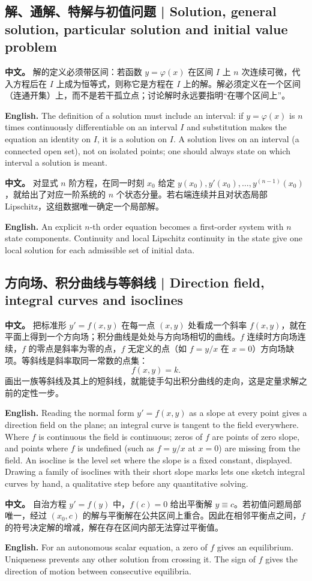 \documentclass[UTF8,11pt,a4paper]{ctexart}
\newcommand{\APS}[2]{\par\noindent\textbf{中文。} #1\par\noindent\textbf{English.} #2\par}
\begin{document}
\subsection{解、通解、特解与初值问题 | Solution, general solution, particular solution and initial value problem}
\APS{解的定义必须带区间：若函数 $y=\varphi(x)$ 在区间 $I$ 上 $n$ 次连续可微，代入方程后在 $I$ 上成为恒等式，则称它是方程在 $I$ 上的解。解必须定义在一个区间（连通开集）上，而不是若干孤立点；讨论解时永远要指明“在哪个区间上”。}{The definition of a solution must include an interval: if $y=\varphi(x)$ is $n$ times continuously differentiable on an interval $I$ and substitution makes the equation an identity on $I$, it is a solution on $I$. A solution lives on an interval (a connected open set), not on isolated points; one should always state on which interval a solution is meant.}
\APS{对显式 $n$ 阶方程，在同一时刻 $x_0$ 给定 $y(x_0),y'(x_0),\dots,y^{(n-1)}(x_0)$，就给出了对应一阶系统的 $n$ 个状态分量。若右端连续并且对状态局部 Lipschitz，这组数据唯一确定一个局部解。}{An explicit $n$-th order equation becomes a first-order system with $n$ state components. Continuity and local Lipschitz continuity in the state give one local solution for each admissible set of initial data.}
\subsection{方向场、积分曲线与等斜线 | Direction field, integral curves and isoclines}
\APS{把标准形 $y'=f(x,y)$ 在每一点 $(x,y)$ 处看成一个斜率 $f(x,y)$，就在平面上得到一个方向场；积分曲线是处处与方向场相切的曲线。$f$ 连续时方向场连续，$f$ 的零点是斜率为零的点，$f$ 无定义的点（如 $f=y/x$ 在 $x=0$）方向场缺项。等斜线是斜率取同一常数的点集：
\[
f(x,y)=k .
\]
画出一族等斜线及其上的短斜线，就能徒手勾出积分曲线的走向，这是定量求解之前的定性一步。}{Reading the normal form $y'=f(x,y)$ as a slope at every point gives a direction field on the plane; an integral curve is tangent to the field everywhere. Where $f$ is continuous the field is continuous; zeros of $f$ are points of zero slope, and points where $f$ is undefined (such as $f=y/x$ at $x=0$) are missing from the field. An isocline is the level set where the slope is a fixed constant, displayed. Drawing a family of isoclines with their short slope marks lets one sketch integral curves by hand, a qualitative step before any quantitative solving.}
\APS{自治方程 $y'=f(y)$ 中，$f(c)=0$ 给出平衡解 $y\equiv c$。若初值问题局部唯一，经过 $(x_0,c)$ 的解与平衡解在公共区间上重合。因此在相邻平衡点之间，$f$ 的符号决定解的增减，解在存在区间内部无法穿过平衡值。}{For an autonomous scalar equation, a zero of $f$ gives an equilibrium. Uniqueness prevents any other solution from crossing it. The sign of $f$ gives the direction of motion between consecutive equilibria.}
\end{document}
